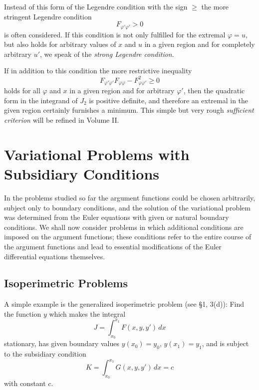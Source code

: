 Instead of this form of the Legendre condition with the sign $\ge$ the more stringent Legendre condition
\[
F_{\varphi'\varphi'}>0
\]
is often considered. If this condition is not only fulfilled for the extremal $\varphi=u$, but also holds for arbitrary values of $x$ and $u$ in a given region and for completely arbitrary $u'$, we speak of the \emph{strong Legendre condition}.

If in addition to this condition the more restrictive inequality
\[
F_{\varphi'\varphi'}F_{\varphi\varphi}-F_{\varphi\varphi'}^2\ge0
\]
holds for all $\varphi$ and $x$ in a given region and for arbitrary $\varphi'$, then the quadratic form in the integrand of $J_2$ is positive definite, and therefore an extremal in the given region certainly furnishes a minimum. This simple but very rough \emph{sufficient criterion} will be refined in Volume II.

\section{Variational Problems with Subsidiary Conditions}
In the problems studied so far the argument functions could be chosen arbitrarily, subject only to boundary conditions, and the solution of the variational problem was determined from the Euler equations with given or natural boundary conditions. We shall now consider problems in which additional conditions are imposed on the argument functions; these conditions refer to the entire course of the argument functions and lead to essential modifications of the Euler differential equations themselves.

\subsection{Isoperimetric Problems}
A simple example is the generalized isoperimetric problem (see \S1, 3(d)): Find the function $y$ which makes the integral
\[
J=\int_{x_0}^{x_1}F(x,y,y')\,dx
\]
stationary, has given boundary values $y(x_0)=y_0$, $y(x_1)=y_1$, and is subject to the subsidiary condition
\begin{equation}\tag{51}
K=\int_{x_0}^{x_1}G(x,y,y')\,dx=c
\end{equation}
with constant $c$.

